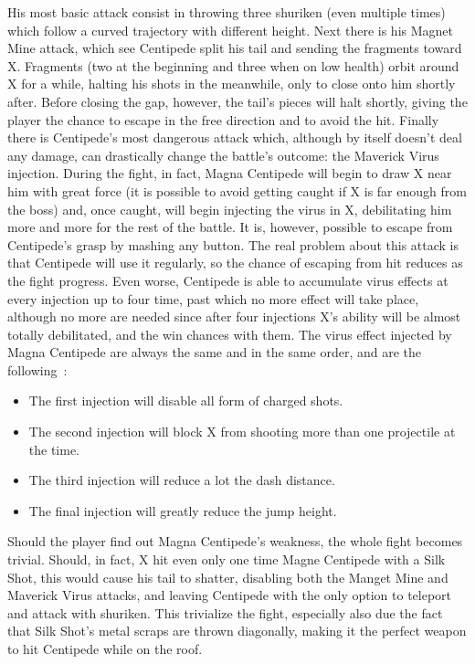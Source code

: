 His most basic attack consist in throwing three shuriken (even multiple times) which follow a curved trajectory with different height. Next there is his Magnet Mine attack, which see Centipede split his tail and sending the fragments toward X. Fragments (two at the beginning and three when on low health) orbit around X for a while, halting his shots in the meanwhile, only to close onto him shortly after. Before closing the gap, however, the tail's pieces will halt shortly, giving the player the chance to escape in the free direction and to avoid the hit. Finally there is Centipede's most dangerous attack which, although by itself doesn't deal any damage, can drastically change the battle's outcome: the Maverick Virus injection. During the fight, in fact, Magna Centipede will begin to draw X near him with great force (it is possible to avoid getting caught if X is far enough from the boss) and, once caught, will begin injecting the virus in X, debilitating him more and more for the rest of the battle. It is, however, possible to escape from Centipede's grasp by mashing any button. The real problem about this attack is that Centipede will use it regularly, so the chance of escaping from hit reduces as the fight progress. Even worse, Centipede is able to accumulate virus effects at every injection up to four time, past which no more effect will take place, although no more are needed since after four injections X's ability will be almost totally debilitated, and the win chances with them. The virus effect injected by Magna Centipede are always the same and in the same order, and are the following~\cite{wiki:Magna_centipede}:
\begin{itemize}
	\item The first injection will disable all form of charged shots.
	\item The second injection will block X from shooting more than one projectile at the time.
	\item The third injection will reduce a lot the dash distance.
	\item The final injection will greatly reduce the jump height.
\end{itemize}

Should the player find out Magna Centipede's weakness, the whole fight becomes trivial. Should, in fact, X hit even only one time Magne Centipede with a Silk Shot, this would cause his tail to shatter, disabling both the Manget Mine and Maverick Virus attacks, and leaving Centipede with the only option to teleport and attack with shuriken. This trivialize the fight, especially also due the fact that Silk Shot's metal scraps are thrown diagonally, making it the perfect weapon to hit Centipede while on the roof.

